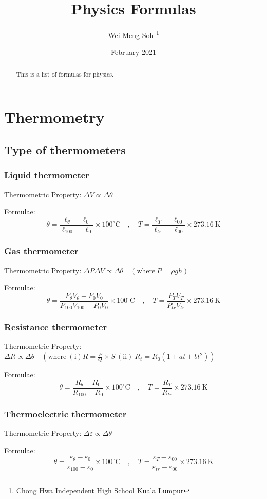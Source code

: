 \documentclass{article}
\title{Physics Formulas}
\author{Wei Meng Soh \thanks{Chong Hwa Independent High School Kuala Lumpur}}
\date{February 2021}
\begin{document}
\maketitle
\begin{abstract}
    This is a list of formulas for physics.
\end{abstract}

\section{Thermometry}
\subsection*{Type of thermometers}

\subsubsection*{Liquid thermometer}
Thermometric Property: \(\Delta V \propto \Delta \theta\)

\noindent Formulae:
\[\theta = \frac{\ell_\theta - \ell_0}{\ell_{100}-\ell_0} \times 100^{\circ} \mathrm{C} \quad, \quad T=\frac{\ell_T-\ell_{00}}{\ell_{tr}-\ell_{00}} \times 273.16\mathrm{~K} \]

\subsubsection*{Gas thermometer}
Thermometric Property: \(\Delta P \Delta V \propto \Delta \theta \quad (\mathrm{where} \ P = \rho gh)\)

\noindent Formulae:
\[\theta = \frac{P_\theta V_\theta - P_0V_0}{P_{100} V_{100} - P_0V_0} \times 100^{\circ} \mathrm{C} \quad, \quad T=\frac{P_T V_T}{P_{tr} V_{tr}} \times 273.16\mathrm{~K} \]

\subsubsection*{Resistance thermometer}
Thermometric Property: \(\Delta R \propto \Delta \theta \quad (\mathrm{where} \ (\mathrm{i}) R=\frac{P}{Q}\times S \ (\mathrm{ii})\ R_t=R_0(1+at+bt^2))\)

\noindent Formulae:
\[\theta = \frac{R_\theta - R_0}{R_{100}-R_0} \times 100^{\circ} \mathrm{C} \quad, \quad T=\frac{R_T}{R_{tr}} \times 273.16\mathrm{~K} \]


\subsubsection*{Thermoelectric thermometer}
Thermometric Property: \(\Delta \varepsilon \propto \Delta \theta\)

\noindent Formulae:
\[\theta = \frac{\varepsilon_\theta - \varepsilon_0}{\varepsilon_{100}-\varepsilon_0} \times 100^{\circ} \mathrm{C} \quad, \quad T=\frac{\varepsilon_T-\varepsilon_{00}}{\varepsilon_{tr}-\varepsilon_{00}} \times 273.16\mathrm{~K} \]
\end{document}
